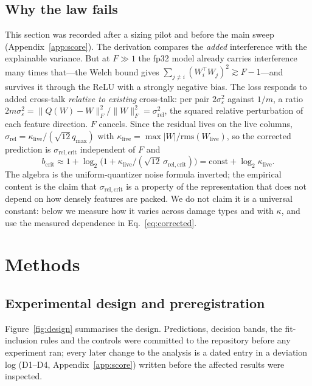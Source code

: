 \documentclass{article}
\begin{document}
\subsection{Why the law fails}
This section was recorded after a sizing pilot and before the main sweep (Appendix~\ref{app:score}). The derivation
compares the \emph{added} interference with the explainable variance. But at $F\gg1$ the fp32 model already carries
interference many times that---the Welch bound gives $\sum_{j\neq i}(W_i^\top W_j)^2 \gtrsim F-1$---and survives it
through the ReLU with a strongly negative bias. The loss responds to added cross-talk \emph{relative to existing}
cross-talk: per pair $2\sigma_\varepsilon^2$ against $1/m$, a ratio $2m\sigma_\varepsilon^2 =
\lVert Q(W)-W\rVert_F^2/\lVert W\rVert_F^2 = \sigma_{\mathrm{rel}}^2$, the squared relative perturbation of each feature
direction. $F$ cancels. Since the residual lives on the live columns, $\sigma_{\mathrm{rel}} =
\kappa_{\mathrm{live}}/(\sqrt{12}q_{\max})$ with $\kappa_{\mathrm{live}} = \max|W|/\mathrm{rms}(W_{\mathrm{live}})$, so the
corrected prediction is $\sigma_{\mathrm{rel,crit}}$ independent of $F$ and
\begin{equation}
b_{\mathrm{crit}} \approx 1+\log_2\!\big(1+\kappa_{\mathrm{live}}/(\sqrt{12}\,\sigma_{\mathrm{rel,crit}})\big) = \mathrm{const} + \log_2\kappa_{\mathrm{live}} .
\label{eq:corrected}
\end{equation}
The algebra is the uniform-quantizer noise formula inverted; the empirical content is the claim that
$\sigma_{\mathrm{rel,crit}}$ is a property of the representation that does not depend on how densely features are packed.
We do not claim it is a universal constant: below we measure how it varies across damage types and with $\kappa$, and use
the measured dependence in Eq.~\eqref{eq:corrected}.

\section{Methods}
\label{sec:methods}

\subsection{Experimental design and preregistration}
Figure~\ref{fig:design} summarises the design. Predictions, decision bands, the fit-inclusion rules and the controls were
committed to the repository before any experiment ran; every later change to the analysis is a dated entry in a deviation
log (D1--D4, Appendix~\ref{app:score}) written before the affected results were inspected.
\end{document}
